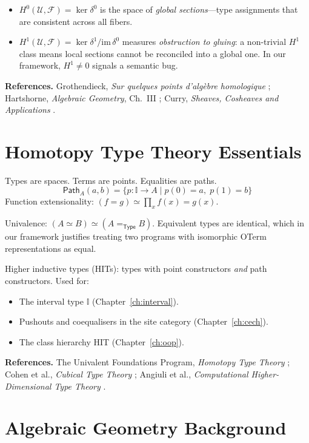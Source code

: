 \documentclass[11pt,a4paper]{report}
\theoremstyle{definition}
\theoremstyle{plain}
\newcommand{\Path}{\mathsf{Path}}
\newcommand{\Type}{\mathsf{Type}}
\newcommand{\Hzero}{H^0}
\newcommand{\Hone}{H^1}
\newcommand{\presheaf}{\mathcal{F}}
\newcommand{\interval}{\mathbb{I}}
\begin{document}
\begin{itemize}
  \item $\Hzero(\mathcal{U}, \presheaf) = \ker \delta^0$ is the space of
    \emph{global sections}---type assignments that are consistent
    across all fibers.
  \item $\Hone(\mathcal{U}, \presheaf) = \ker \delta^1 / \mathrm{im}\, \delta^0$
    measures \emph{obstruction to gluing}: a non-trivial $\Hone$ class
    means local sections cannot be reconciled into a global one.
    In our framework, $\Hone \neq 0$ signals a semantic bug.
\end{itemize}

\noindent
\textbf{References.}
Grothendieck, \emph{Sur quelques points d'alg\`ebre homologique}
\cite{grothendieck1957};
Hartshorne, \emph{Algebraic Geometry}, Ch.~III \cite{hartshorne1977};
Curry, \emph{Sheaves, Cosheaves and Applications} \cite{curry2014}.

\section{Homotopy Type Theory Essentials}

Types are spaces.  Terms are points.  Equalities are paths.
\[
  \Path_A(a, b) = \{p : \interval \to A \mid p(0) = a,\; p(1) = b\}
\]
Function extensionality: $(f = g) \simeq \prod_x f(x) = g(x)$.

\noindent
Univalence: $(A \simeq B) \simeq (A =_\Type B)$.  Equivalent types
are identical, which in our framework justifies treating two programs
with isomorphic OTerm representations as equal.

\noindent
Higher inductive types (HITs): types with point constructors \emph{and}
path constructors.  Used for:
\begin{itemize}
  \item The interval type $\interval$ (Chapter~\ref{ch:interval}).
  \item Pushouts and coequalisers in the site category
    (Chapter~\ref{ch:cech}).
  \item The class hierarchy HIT (Chapter~\ref{ch:oop}).
\end{itemize}

\noindent
\textbf{References.}
The Univalent Foundations Program, \emph{Homotopy Type Theory} \cite{hott};
Cohen et al., \emph{Cubical Type Theory} \cite{cohen2018};
Angiuli et al., \emph{Computational Higher-Dimensional Type Theory}
\cite{angiuli2018}.

\section{Algebraic Geometry Background}
\end{document}
